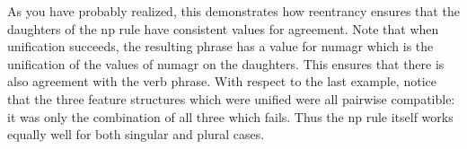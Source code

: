 \documentclass[12pt]{report}
\begin{document}
\begin{enumerate}
As you have probably realized, this demonstrates 
how reentrancy ensures that the daughters of the np rule
have consistent values for agreement.
Note that when unification succeeds, the resulting
phrase has a value for {\feature numagr} which is the
unification of the values of {\feature numagr} on the daughters.
This ensures that there is also agreement with the verb phrase.
With respect to the last example, notice that
the three feature structures which were unified were all 
pairwise compatible: it was only the combination of
all three which fails.  Thus the np rule itself works
equally well for both singular and plural cases.


\end{enumerate}
\end{document}
